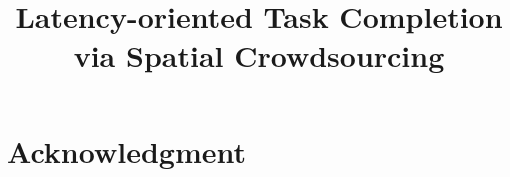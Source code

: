 \documentclass[conference,letterpaper]{IEEEtran}
\begin{document}
	

\title{Latency-oriented Task Completion \\
	via Spatial Crowdsourcing}

\author{\IEEEauthorblockN{}
	}

\maketitle


\newtheorem{definition}{Definition} %
\newtheorem{example}{Example} %
\newtheorem{lemma}{Lemma} %
\newtheorem{theorem}{Theorem} %
\newtheorem{corollary}{Corollary} %



\IEEEpeerreviewmaketitle








\section*{Acknowledgment}
\balance
	



\end{document}
